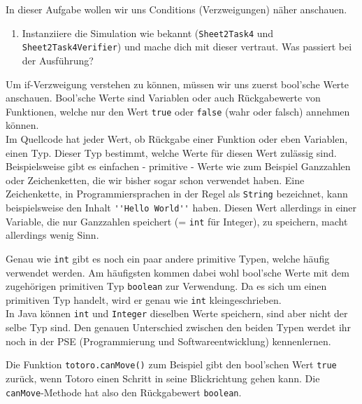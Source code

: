 

In dieser Aufgabe wollen wir uns Conditions (Verzweigungen) näher anschauen.

\begin{enumerate}                           
    \item Instanziiere die Simulation wie bekannt (\lstinline{Sheet2Task4} und \lstinline{Sheet2Task4Verifier}) und mache dich mit dieser vertraut.
        Was passiert bei der Ausführung?
\end{enumerate}

\begin{Infobox}
    Um if-Verzweigung verstehen zu können, müssen wir uns zuerst bool'sche Werte anschauen. 
    Bool'sche Werte sind Variablen oder auch Rückgabewerte von Funktionen, welche nur den Wert \lstinline{true} oder \lstinline{false} (wahr oder falsch) annehmen können. \\
Im Quellcode hat jeder Wert, ob Rückgabe einer Funktion oder eben Variablen, einen Typ.
Dieser Typ bestimmt, welche Werte für diesen Wert zulässig sind.
Beispielsweise gibt es einfachen - primitive - Werte wie zum Beispiel Ganzzahlen oder Zeichenketten, die wir bisher sogar schon verwendet haben.
Eine Zeichenkette, in Programmiersprachen in der Regel als \lstinline{String} bezeichnet, kann beispielsweise den Inhalt \lstinline{''Hello World''} haben.
Diesen Wert allerdings in einer Variable, die nur Ganzzahlen speichert (= \lstinline{int} für Integer), zu speichern, macht allerdings wenig Sinn.

Genau wie \lstinline{int} gibt es noch ein paar andere primitive Typen, welche häufig verwendet werden.
Am häufigsten kommen dabei wohl bool'sche Werte mit dem zugehörigen primitiven Typ \lstinline{boolean} zur Verwendung.
Da es sich um einen primitiven Typ handelt, wird er genau wie \lstinline{int} kleingeschrieben.\\

In Java können \lstinline{int} und \lstinline{Integer} dieselben Werte speichern, sind aber nicht der selbe Typ sind.
Den genauen Unterschied zwischen den beiden Typen werdet ihr noch in der PSE (Programmierung und Softwareentwicklung) kennenlernen.

Die Funktion \lstinline{totoro.canMove()} zum Beispiel gibt den bool'schen Wert \lstinline{true} zurück, wenn Totoro einen Schritt in seine Blickrichtung gehen kann.
Die \lstinline{canMove}-Methode hat also den Rückgabewert \lstinline{boolean}.
    
\end{Infobox}


